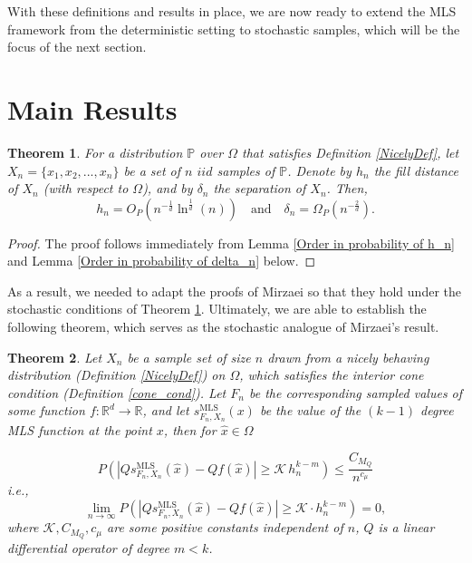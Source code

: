 \documentclass{article}
\newtheorem{theorem}{Theorem}
\newcommand{\mlsfunstoch}{s^\text{MLS}_{F_n,X_n}}
\begin{document}
With these definitions and results in place, we are now ready to extend the MLS framework from the deterministic setting to stochastic samples, which will be the focus of the next section.

\section{Main Results}

\begin{theorem}
    For a distribution $\mathbb{P}$ over $\Omega$ that satisfies Definition \ref{NicelyDef}, let $X_n=\{x_1,x_2,...,x_n\}$ be a set of $n$ $iid$ samples of $\mathbb{P}$. Denote by $h_n$ the fill distance of $X_n$ (with respect to $\Omega$), and by $\delta_n$ the separation of $X_n$. 
    Then, 
         \begin{equation}
            h_n = O_P(n^{-\frac{1}{d}} \ln ^{\frac{1}{d}}(n))\quad \mbox{and} \quad \delta_n = \Omega_P(n^{-\frac{2}{d}}).
         \end{equation}
         \label{theorem of order of probability}
\end{theorem}
\begin{proof}
    The proof follows immediately from Lemma \ref{Order in probability of h_n} and Lemma \ref{Order in probability of delta_n} below.
\end{proof}

As a result, we needed to adapt the proofs of Mirzaei \cite{mirzaei2015analysis} so that they hold under the stochastic conditions of Theorem \ref{theorem of order of probability}. Ultimately, we are able to establish the following theorem, which serves as the stochastic analogue of Mirzaei’s result.

\begin{theorem}
Let $X_n$ be a sample set of size $n$ drawn from a nicely behaving distribution \emph{(}Definition \ref{NicelyDef}\emph{)} on $\Omega$, which satisfies the interior cone condition \emph{(}Definition \ref{cone_cond}\emph{)}. 
Let $F_n$ be the corresponding sampled values of some function $f:\mathbb{R}^d\rightarrow\mathbb{R}$, and let $\mlsfunstoch(x)$ be the value of the $(k-1)$ degree MLS function at the point $x$, then   for $\hat{x}\in \Omega$ 

\begin{equation}
P\!\left(\left|Q\mlsfunstoch(\hat{x})-Qf(\hat{x})\right|
\ge \mathcal{K}\,h_n^{k-m}\right)\leq \frac{C_{M_Q}}{n^{c_\mu}}
\label{mainResultEqProb}
\end{equation}
i.e.,
\begin{equation}
\lim_{n\rightarrow\infty}P\left(\left|Q \mlsfunstoch(\hat{x})-Qf(\hat{x})\right| \geq\mathcal{K}\cdot h_n^{k-m}\right)=0,
\end{equation}
where $\mathcal{K},C_{M_Q},{c_\mu}$ are some positive constants independent of $n$, $Q$ is a linear differential operator of degree $m< k$.    
    \label{main_result}
\end{theorem}
\end{document}
